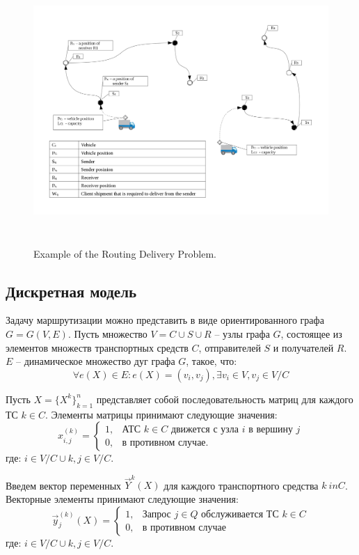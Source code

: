 \documentclass[]{TAACpaper}
\begin{document}
\begin{figure}[h]
	\hfil\includegraphics[height=4.0in]{images/scheme}\hfil
	\caption
	{
		Example of the Routing Delivery Problem.
	}
	\label{aba:fig1}
\end{figure}

\subsection{Дискретная модель}
Задачу маршрутизации можно представить в виде ориентированного графа $G=G(V,E)$. Пусть множество $V=C\cup{S}\cup{R}$ -- узлы графа $G$,  состоящее из элементов множеств транспортных средств $C$, отправителей $S$ и получателей $R$. $E$ -- динамическое множество дуг графа $G$, такое, что:
\begin{equation}
\forall e(X) \in E: e(X) = (v_i,v_j), \exists v_i \in V, v_j \in V/C
\end{equation}

Пусть $X = \{X^k\}^n_{k=1}$ представляет собой последовательность матриц для каждого ТС $k \in C$. Элементы матрицы принимают следующие значения:
\begin{equation}
  x^{(k)}_{i,j} = 
    \begin{cases}
	  1,&\text{АТС $k \in C$ движется с узла $i$ в вершину $j$}\\
	  0,&\text{в противном случае.}
    \end{cases}
\end{equation}
где: $i\in{V/C \cup {k}}, j \in V/C$.

Введем вектор переменных $ \vec{Y}  ^ k(X) $ для каждого транспортного средства  $ k \ in C $. Векторные элементы принимают следующие значения:
\begin{equation}
\vec{y}^{(k)}_{j}(X) = 
\begin{cases}
1,&\text{Запрос $j \in Q$ обслуживается ТС $k \in C$}\\
0,&\text{в противном случае}
\end{cases}
\end{equation}
где: $i\in{V/C \cup {k}}, j \in V/C$.
\end{document}
